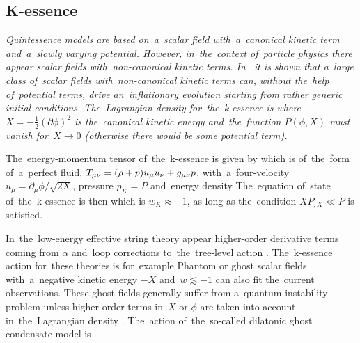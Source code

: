 \subsection{K-essence}
{\itshape
Quintessence models are based on~a~scalar field with~a~canonical kinetic term and~a~slowly varying potential. However, in~the~context of~particle physics there appear scalar fields with~non-canonical kinetic terms. In~\textcite{1999PhLB..458..209A} it is shown that a~large class of~scalar fields with~non-canonical kinetic terms can, without the~help of~potential terms, drive an~inflationary evolution starting from rather generic initial conditions. The~Lagrangian density for~the~k-essence is
where $X=-\frac12(\partial\phi)^2$ is the~canonical kinetic energy and~the~function $P(\phi, X)$ must vanish for~$X\rightarrow0$ (otherwise there would be some potential term). 

The~energy-momentum tensor of~the~k-essence is given by
which is of~the~form of~a~perfect fluid, $T_{\mu\nu}=(\rho+p)u_\mu u_\nu+g_{\mu\nu} p$, with~a~four-velocity $u_\mu=\partial_\mu\phi/\sqrt{2X}$, pressure $p_K=P$ and~energy density
The~equation of~state of~the~k-essence is then
which is $w_K\approx-1$, as long as the~condition $XP_{,X}\ll P$ is satisfied.

In~the~low-energy effective string theory appear higher-order derivative terms coming from $\alpha$ and~loop corrections to~the~tree-level action \parencite{2003PhR...373....1G}. The~k-essence action for~these theories is for~example
Phantom or ghost scalar fields with~a~negative kinetic energy $-X$ and~$w\lesssim-1$ can also fit the~current observations. These ghost fields generally suffer from a~quantum instability problem unless higher-order terms in~$X$ or $\phi$ are taken into account in~the~Lagrangian density \parencite{2010deto.book.....A}. The~action of~the~so-called dilatonic ghost condensate model is \parencite{2004JCAP...07..004P}
} %
